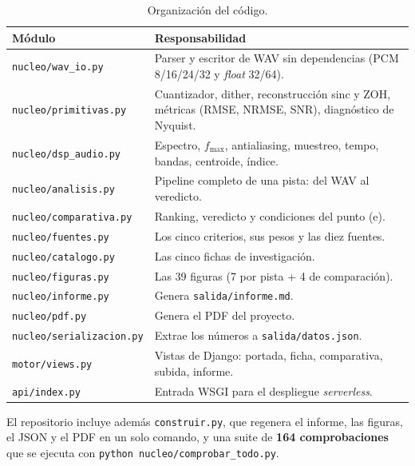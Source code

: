 \documentclass[11pt,a4paper]{article}
\newcommand{\fmax}{f_{\max}}
\begin{document}
\begin{table}[H]
\centering
\small
\begin{tabularx}{\linewidth}{@{}l >{\raggedright\arraybackslash}X@{}}
\toprule
\textbf{Módulo} & \textbf{Responsabilidad} \\
\midrule
\texttt{nucleo/wav\_io.py} & Parser y escritor de WAV sin dependencias (PCM 8/16/24/32 y \textit{float} 32/64). \\
\texttt{nucleo/primitivas.py} & Cuantizador, dither, reconstrucción sinc y ZOH, métricas (RMSE, NRMSE, SNR), diagnóstico de Nyquist. \\
\texttt{nucleo/dsp\_audio.py} & Espectro, \(\fmax\), antialiasing, muestreo, tempo, bandas, centroide, índice. \\
\texttt{nucleo/analisis.py} & Pipeline completo de una pista: del WAV al veredicto. \\
\texttt{nucleo/comparativa.py} & Ranking, veredicto y condiciones del punto (e). \\
\texttt{nucleo/fuentes.py} & Los cinco criterios, sus pesos y las diez fuentes. \\
\texttt{nucleo/catalogo.py} & Las cinco fichas de investigación. \\
\texttt{nucleo/figuras.py} & Las 39 figuras (7 por pista + 4 de comparación). \\
\texttt{nucleo/informe.py} & Genera \texttt{salida/informe.md}. \\
\texttt{nucleo/pdf.py} & Genera el PDF del proyecto. \\
\texttt{nucleo/serializacion.py} & Extrae los números a \texttt{salida/datos.json}. \\
\texttt{motor/views.py} & Vistas de Django: portada, ficha, comparativa, subida, informe. \\
\texttt{api/index.py} & Entrada WSGI para el despliegue \emph{serverless}. \\
\bottomrule
\end{tabularx}
\caption{Organización del código.}
\label{tab:modulos}
\end{table}

El repositorio incluye además \texttt{construir.py}, que regenera el informe,
las figuras, el JSON y el PDF en un solo comando, y una suite de
\textbf{164 comprobaciones} que se ejecuta con
\texttt{python nucleo/comprobar\_todo.py}.
\end{document}
